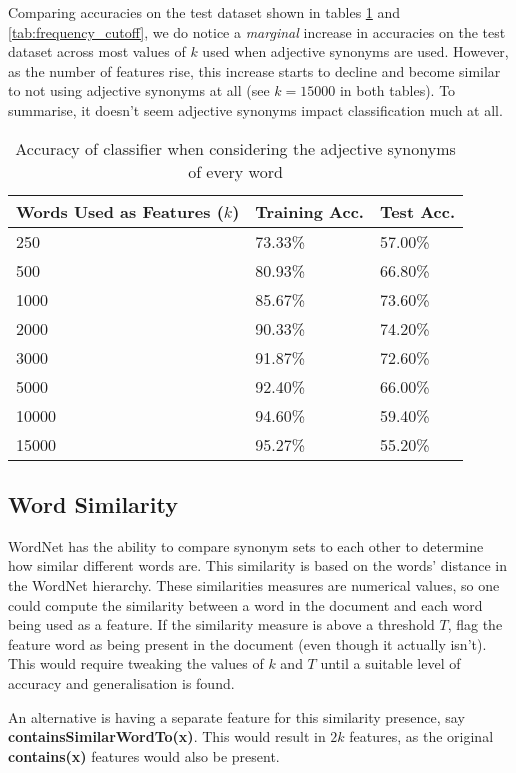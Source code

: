 \documentclass{article}
\begin{document}
Comparing accuracies on the test dataset shown in tables \ref{tab:adjective_synonyms} and \ref{tab:frequency_cutoff}, we do notice a \textit{marginal} increase in accuracies on the test dataset across most values of $k$ used when adjective synonyms are used. However, as the number of features rise, this increase starts to decline and become similar to not using adjective synonyms at all (see $k = 15000$ in both tables). To summarise, it doesn't seem adjective synonyms impact classification much at all.

\begin{table}
	\centering
	\begin{tabular}{|l|l|l|}
	\hline
	\textbf{Words Used as Features ($k$)} & \textbf{Training Acc.} & \textbf{Test Acc.} \\
	\hline
	250 & 73.33\% & 57.00\% \\
	500 & 80.93\% & 66.80\% \\
	1000 & 85.67\% & 73.60\% \\
	2000 & 90.33\% & 74.20\% \\
	3000 & 91.87\% & 72.60\% \\
	5000 & 92.40\% & 66.00\% \\
	10000 & 94.60\% & 59.40\% \\
	15000 & 95.27\% & 55.20\% \\
	\hline
	\end{tabular}
	\caption{Accuracy of classifier when considering the adjective synonyms of every word}
	\label{tab:adjective_synonyms}
\end{table}

\subsection{Word Similarity}

WordNet has the ability to compare synonym sets to each other to determine how similar different words are. This similarity is based on the words' distance in the WordNet hierarchy. These similarities measures are numerical values, so one could compute the similarity between a word in the document and each word being used as a feature. If the similarity measure is above a threshold $T$, flag the feature word as being present in the document (even though it actually isn't). This would require tweaking the values of $k$ and $T$ until a suitable level of accuracy and generalisation is found. 

An alternative is having a separate feature for this similarity presence, say \textbf{containsSimilarWordTo(x)}. This would result in $2k$ features, as the original \textbf{contains(x)} features would also be present.
\end{document}
